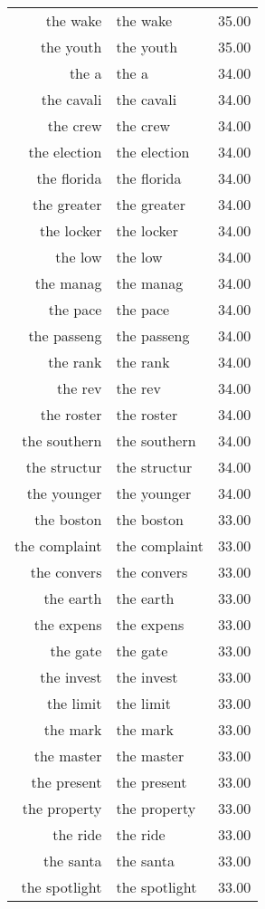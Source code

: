 \begin{table}[ht]
\begin{tabular}{rlr}
  the wake & the wake & 35.00 \\ 
  the youth & the youth & 35.00 \\ 
  the a & the a & 34.00 \\ 
  the cavali & the cavali & 34.00 \\ 
  the crew & the crew & 34.00 \\ 
  the election & the election & 34.00 \\ 
  the florida & the florida & 34.00 \\ 
  the greater & the greater & 34.00 \\ 
  the locker & the locker & 34.00 \\ 
  the low & the low & 34.00 \\ 
  the manag & the manag & 34.00 \\ 
  the pace & the pace & 34.00 \\ 
  the passeng & the passeng & 34.00 \\ 
  the rank & the rank & 34.00 \\ 
  the rev & the rev & 34.00 \\ 
  the roster & the roster & 34.00 \\ 
  the southern & the southern & 34.00 \\ 
  the structur & the structur & 34.00 \\ 
  the younger & the younger & 34.00 \\ 
  the boston & the boston & 33.00 \\ 
  the complaint & the complaint & 33.00 \\ 
  the convers & the convers & 33.00 \\ 
  the earth & the earth & 33.00 \\ 
  the expens & the expens & 33.00 \\ 
  the gate & the gate & 33.00 \\ 
  the invest & the invest & 33.00 \\ 
  the limit & the limit & 33.00 \\ 
  the mark & the mark & 33.00 \\ 
  the master & the master & 33.00 \\ 
  the present & the present & 33.00 \\ 
  the property & the property & 33.00 \\ 
  the ride & the ride & 33.00 \\ 
  the santa & the santa & 33.00 \\ 
  the spotlight & the spotlight & 33.00 \\ 

\end{tabular}
\end{table}
